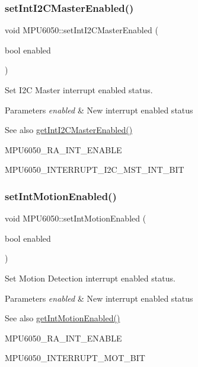 \subsubsection{\texorpdfstring{setIntI2CMasterEnabled()}{setIntI2CMasterEnabled()}}
{\footnotesize\ttfamily void M\+P\+U6050\+::set\+Int\+I2\+C\+Master\+Enabled (\begin{DoxyParamCaption}\item[{bool}]{enabled }\end{DoxyParamCaption})}

Set I2C Master interrupt enabled status. 
\begin{DoxyParams}{Parameters}
{\em enabled} & New interrupt enabled status \\
\hline
\end{DoxyParams}
\begin{DoxySeeAlso}{See also}
\mbox{\hyperlink{class_m_p_u6050_a282ae29e029d88604a59c92bdf9ce252}{get\+Int\+I2\+C\+Master\+Enabled()}} 

M\+P\+U6050\+\_\+\+R\+A\+\_\+\+I\+N\+T\+\_\+\+E\+N\+A\+B\+LE 

M\+P\+U6050\+\_\+\+I\+N\+T\+E\+R\+R\+U\+P\+T\+\_\+\+I2\+C\+\_\+\+M\+S\+T\+\_\+\+I\+N\+T\+\_\+\+B\+IT 
\end{DoxySeeAlso}
\mbox{\label{class_m_p_u6050_a2d2d1d3b03198a09c83a48ec3bc20bd8}} 
\subsubsection{\texorpdfstring{setIntMotionEnabled()}{setIntMotionEnabled()}}
{\footnotesize\ttfamily void M\+P\+U6050\+::set\+Int\+Motion\+Enabled (\begin{DoxyParamCaption}\item[{bool}]{enabled }\end{DoxyParamCaption})}

Set Motion Detection interrupt enabled status. 
\begin{DoxyParams}{Parameters}
{\em enabled} & New interrupt enabled status \\
\hline
\end{DoxyParams}
\begin{DoxySeeAlso}{See also}
\mbox{\hyperlink{class_m_p_u6050_a7de31a8e9f22765329d9f9e02db2f1f0}{get\+Int\+Motion\+Enabled()}} 

M\+P\+U6050\+\_\+\+R\+A\+\_\+\+I\+N\+T\+\_\+\+E\+N\+A\+B\+LE 

M\+P\+U6050\+\_\+\+I\+N\+T\+E\+R\+R\+U\+P\+T\+\_\+\+M\+O\+T\+\_\+\+B\+IT 
\end{DoxySeeAlso}
\mbox{\label{class_m_p_u6050_a5e36e3acace6e545718d7997169cff9b}} 
